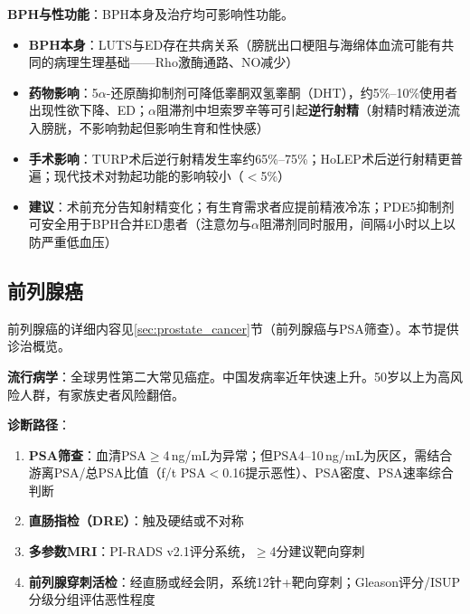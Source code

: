 \textbf{BPH与性功能}：BPH本身及治疗均可影响性功能。
\begin{itemize}[leftmargin=2cm]
	\item \textbf{BPH本身}：LUTS与ED存在共病关系（膀胱出口梗阻与海绵体血流可能有共同的病理生理基础——Rho激酶通路、NO减少）
	\item \textbf{药物影响}：5$\alpha$-还原酶抑制剂可降低睾酮双氢睾酮（DHT），约5\%--10\%使用者出现性欲下降、ED；$\alpha$阻滞剂中坦索罗辛等可引起\textbf{逆行射精}（射精时精液逆流入膀胱，不影响勃起但影响生育和性快感）
	\item \textbf{手术影响}：TURP术后逆行射精发生率约65\%--75\%；HoLEP术后逆行射精更普遍；现代技术对勃起功能的影响较小（$<$5\%）
	\item \textbf{建议}：术前充分告知射精变化；有生育需求者应提前精液冷冻；PDE5抑制剂可安全用于BPH合并ED患者（注意勿与$\alpha$阻滞剂同时服用，间隔4小时以上以防严重低血压）
\end{itemize}

\subsection{前列腺癌}

前列腺癌的详细内容见\ref{sec:prostate_cancer}节（前列腺癌与PSA筛查）。本节提供诊治概览。

\textbf{流行病学}：全球男性第二大常见癌症。中国发病率近年快速上升。50岁以上为高风险人群，有家族史者风险翻倍。

\textbf{诊断路径}：
\begin{enumerate}
	\item \textbf{PSA筛查}：血清PSA$\ge$4\,ng/mL为异常；但PSA4--10\,ng/mL为灰区，需结合游离PSA/总PSA比值（f/t PSA$<$0.16提示恶性）、PSA密度、PSA速率综合判断
	\item \textbf{直肠指检（DRE）}：触及硬结或不对称
	\item \textbf{多参数MRI}：PI-RADS v2.1评分系统，$\ge$4分建议靶向穿刺
	\item \textbf{前列腺穿刺活检}：经直肠或经会阴，系统12针+靶向穿刺；Gleason评分/ISUP分级分组评估恶性程度
\end{enumerate}

